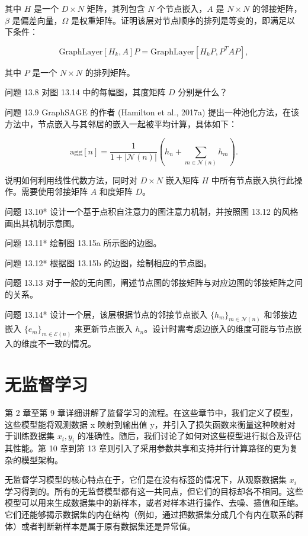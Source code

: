 \documentclass[lang=cn,newtx,10pt,scheme=chinese]{elegantbook}
\begin{document}
其中 \(H\) 是一个 \(D \times N\) 矩阵，其列包含 \(N\) 个节点嵌入，\(A\) 是 \(N \times N\) 的邻接矩阵，\(\beta\) 是偏差向量，\(\Omega\) 是权重矩阵。证明该层对节点顺序的排列是等变的，即满足以下条件：

\begin{equation}
\text{GraphLayer}[H_k, A]P = \text{GraphLayer}[H_k P, P^T AP], 
\end{equation}

其中 \(P\) 是一个 \(N \times N\) 的排列矩阵。

问题 13.8 对图 13.14 中的每幅图，其度矩阵 \(D\) 分别是什么？

问题 13.9 GraphSAGE 的作者 (Hamilton et al., 2017a) 提出一种池化方法，在该方法中，节点嵌入与其邻居的嵌入一起被平均计算，具体如下：

\begin{equation}
\text{agg}[n] = \frac{1}{1 + |\mathcal{N}(n)|} \left( h_n + \sum_{m \in \mathcal{N}(n)} h_m \right). 
\end{equation}

说明如何利用线性代数方法，同时对 \(D \times N\) 嵌入矩阵 \(H\) 中所有节点嵌入执行此操作。需要使用邻接矩阵 \(A\) 和度矩阵 \(D\)。

问题 13.10* 设计一个基于点积自注意力的图注意力机制，并按照图 13.12 的风格画出其机制示意图。

问题 13.11* 绘制图 13.15a 所示图的边图。

问题 13.12* 根据图 13.15b 的边图，绘制相应的节点图。

问题 13.13 对于一般的无向图，阐述节点图的邻接矩阵与对应边图的邻接矩阵之间的关系。

问题 13.14* 设计一个层，该层根据节点的邻接节点嵌入 \(\{h_m\}_{m\in\mathcal{N}(n)}\) 和邻接边嵌入 \(\{e_m\}_{m\in\mathcal{E}(n)}\) 来更新节点嵌入 \(h_n\)。设计时需考虑边嵌入的维度可能与节点嵌入的维度不一致的情况。


\chapter{无监督学习}

第 2 章至第 9 章详细讲解了监督学习的流程。在这些章节中，我们定义了模型，这些模型能将观测数据 x 映射到输出值 y，并引入了损失函数来衡量这种映射对于训练数据集 \({x_i , y_i }\) 的准确性。随后，我们讨论了如何对这些模型进行拟合及评估其性能。第 10 章到第 13 章则引入了采用参数共享和支持并行计算路径的更为复杂的模型架构。

无监督学习模型的核心特点在于，它们是在没有标签的情况下，从观察数据集 \({x_i}\) 学习得到的。所有的无监督模型都有这一共同点，但它们的目标却各不相同。这些模型可以用来生成数据集中的新样本，或者对样本进行操作、去噪、插值和压缩。它们还能够揭示数据集的内在结构（例如，通过把数据集分成几个有内在联系的群体）或者判断新样本是属于原有数据集还是异常值。
\end{document}
